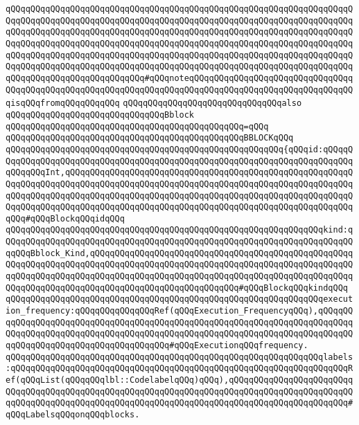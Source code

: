 \verb|qQQqqQQqqQQqqQQqqQQqqQQqqQQqqQQqqQQqqQQqqQQqqQQqqQQqqQQqqQQqqQQqqQQqqQQqqQQqqQQqqQQqqQQqqQQqqQQqqQQqqQQqqQQqqQQqqQQqqQQqqQQqqQQqqQQqqQQqqQQqqQQqqQQqqQQqqQQqqQQqqQQqqQQqqQQqqQQqqQQqqQQqqQQqqQQqqQQqqQQqqQQqqQQqqQQqqQQqqQQqqQQqqQQqqQQqqQQqqQQqqQQqqQQqqQQqqQQqqQQqqQQqqQQqqQQqqQQqqQQqqQQqqQQqqQQqqQQqqQQqqQQqqQQqqQQqqQQqqQQqqQQqqQQqqQQqqQQqqQQqqQQqqQQqqQQqqQQqqQQqqQQqqQQqqQQqqQQqqQQqqQQqqQQqqQQqqQQqqQQqqQQqqQQqqQQqqQQqqQQqqQQqqQQqqQQqqQQqqQQqqQQqqQQq#qQQqnoteqQQqqQQqqQQqqQQqqQQqqQQqqQQqqQQqqQQqqQQqqQQqqQQqqQQqqQQqqQQqqQQqqQQqqQQqqQQqqQQqqQQqqQQqqQQqqQQqqQQqqQQqisqQQqfromqQQqqQQqqQQq|\newline
\verb|qQQqqQQqqQQqqQQqqQQqqQQqqQQqqQQqalso|\newline
\verb|qQQqqQQqqQQqqQQqqQQqqQQqqQQqqQQqBblock|\newline
\verb|qQQqqQQqqQQqqQQqqQQqqQQqqQQqqQQqqQQqqQQqqQQqqQQq=qQQq|\newline
\verb|qQQqqQQqqQQqqQQqqQQqqQQqqQQqqQQqqQQqqQQqqQQqqQQqBBLOCKqQQq|\newline
\verb|qQQqqQQqqQQqqQQqqQQqqQQqqQQqqQQqqQQqqQQqqQQqqQQqqQQqqQQq{qQQqid:qQQqqQQqqQQqqQQqqQQqqQQqqQQqqQQqqQQqqQQqqQQqqQQqqQQqqQQqqQQqqQQqqQQqqQQqqQQqqQQqqQQqInt,qQQqqQQqqQQqqQQqqQQqqQQqqQQqqQQqqQQqqQQqqQQqqQQqqQQqqQQqqQQqqQQqqQQqqQQqqQQqqQQqqQQqqQQqqQQqqQQqqQQqqQQqqQQqqQQqqQQqqQQqqQQqqQQqqQQqqQQqqQQqqQQqqQQqqQQqqQQqqQQqqQQqqQQqqQQqqQQqqQQqqQQqqQQqqQQqqQQqqQQqqQQqqQQqqQQqqQQqqQQqqQQqqQQqqQQqqQQqqQQqqQQqqQQqqQQqqQQqqQQqqQQqqQQqqQQq#qQQqBlockqQQqidqQQq|\newline
\verb|qQQqqQQqqQQqqQQqqQQqqQQqqQQqqQQqqQQqqQQqqQQqqQQqqQQqqQQqqQQqqQQqkind:qQQqqQQqqQQqqQQqqQQqqQQqqQQqqQQqqQQqqQQqqQQqqQQqqQQqqQQqqQQqqQQqqQQqqQQqqQQqBblock_Kind,qQQqqQQqqQQqqQQqqQQqqQQqqQQqqQQqqQQqqQQqqQQqqQQqqQQqqQQqqQQqqQQqqQQqqQQqqQQqqQQqqQQqqQQqqQQqqQQqqQQqqQQqqQQqqQQqqQQqqQQqqQQqqQQqqQQqqQQqqQQqqQQqqQQqqQQqqQQqqQQqqQQqqQQqqQQqqQQqqQQqqQQqqQQqqQQqqQQqqQQqqQQqqQQqqQQqqQQqqQQqqQQqqQQqqQQqqQQqqQQq#qQQqBlockqQQqkindqQQq|\newline
\verb|qQQqqQQqqQQqqQQqqQQqqQQqqQQqqQQqqQQqqQQqqQQqqQQqqQQqqQQqqQQqqQQqexecution_frequency:qQQqqQQqqQQqqQQqRef(qQQqExecution_FrequencyqQQq),qQQqqQQqqQQqqQQqqQQqqQQqqQQqqQQqqQQqqQQqqQQqqQQqqQQqqQQqqQQqqQQqqQQqqQQqqQQqqQQqqQQqqQQqqQQqqQQqqQQqqQQqqQQqqQQqqQQqqQQqqQQqqQQqqQQqqQQqqQQqqQQqqQQqqQQqqQQqqQQqqQQqqQQqqQQqqQQqqQQq#qQQqExecutionqQQqfrequency.|\newline
\verb|qQQqqQQqqQQqqQQqqQQqqQQqqQQqqQQqqQQqqQQqqQQqqQQqqQQqqQQqqQQqqQQqlabels:qQQqqQQqqQQqqQQqqQQqqQQqqQQqqQQqqQQqqQQqqQQqqQQqqQQqqQQqqQQqqQQqqQQqRef(qQQqList(qQQqqQQqlbl::CodelabelqQQq)qQQq),qQQqqQQqqQQqqQQqqQQqqQQqqQQqqQQqqQQqqQQqqQQqqQQqqQQqqQQqqQQqqQQqqQQqqQQqqQQqqQQqqQQqqQQqqQQqqQQqqQQqqQQqqQQqqQQqqQQqqQQqqQQqqQQqqQQqqQQqqQQqqQQqqQQqqQQqqQQqqQQqqQQq#qQQqLabelsqQQqonqQQqblocks.|\newline
